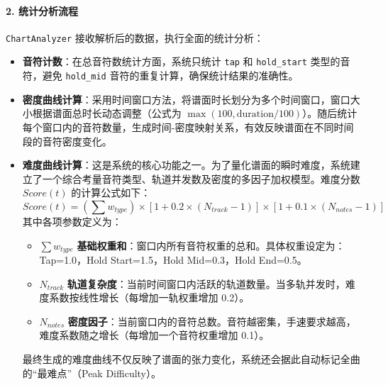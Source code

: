 \documentclass[12pt, a4paper]{article}
\begin{document}
\paragraph{2. 统计分析流程}
\texttt{ChartAnalyzer} 接收解析后的数据，执行全面的统计分析：
\begin{itemize}
    \item \textbf{音符计数}：在总音符数统计方面，系统只统计 \texttt{tap} 和 \texttt{hold\_start} 类型的音符，避免 \texttt{hold\_mid} 音符的重复计算，确保统计结果的准确性。
    \item \textbf{密度曲线计算}：采用时间窗口方法，将谱面时长划分为多个时间窗口，窗口大小根据谱面总时长动态调整（公式为 $\max(100, \text{duration}/100)$）。随后统计每个窗口内的音符数量，生成时间-密度映射关系，有效反映谱面在不同时间段的音符密度变化。
    \item \textbf{难度曲线计算}：这是系统的核心功能之一。为了量化谱面的瞬时难度，系统建立了一个综合考量音符类型、轨道并发数及密度的多因子加权模型。难度分数 $Score(t)$ 的计算公式如下：
    \begin{equation}
        Score(t) = \left(\sum w_{type}\right) \times \left[1 + 0.2 \times (N_{track}-1)\right] \times \left[1 + 0.1 \times (N_{notes}-1)\right]
    \end{equation}
    其中各项参数定义为：
    \begin{itemize}
        \item $\sum w_{type}$ \textbf{基础权重和}：窗口内所有音符权重的总和。具体权重设定为：Tap=1.0，Hold Start=1.5，Hold Mid=0.3，Hold End=0.5。
        \item $N_{track}$ \textbf{轨道复杂度}：当前时间窗口内活跃的轨道数量。当多轨并发时，难度系数按线性增长（每增加一轨权重增加 0.2）。
        \item $N_{notes}$ \textbf{密度因子}：当前窗口内的音符总数。音符越密集，手速要求越高，难度系数随之增长（每增加一个音符权重增加 0.1）。
    \end{itemize}
    最终生成的难度曲线不仅反映了谱面的张力变化，系统还会据此自动标记全曲的“最难点”（Peak Difficulty）。
\end{itemize}
\end{document}
